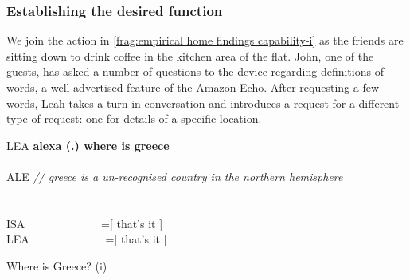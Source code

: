 \subsubsection{Establishing the desired function}\label{sec:empirical home findings capability establish}
\begin{revisedsubmission}
We join the action in \autoref{frag:empirical home findings capability-i} as the friends are sitting down to drink coffee in the kitchen area of the flat.
John, one of the guests, has asked a number of questions to the device regarding definitions of words, a well-advertised feature of the Amazon Echo.
After requesting a few words, Leah takes a turn in conversation and introduces a request for a different type of request: one for details of a specific location.
\end{revisedsubmission}

\begin{inlinefrag}
    {
    \begin{transcript}
        \by LEA {\textbf{alexa (.) where is greece}} \\
         \\
        \by ALE {\textit{// greece is a un-recognised country in the northern hemisphere}} \\
         \\
         \\
        \by ISA {~~~~~~~~~~~~~=[ that’s it ]} \\
        \by LEA {~~~~~~~~~~~~~=[ that’s it ]} \\
    \end{transcript}
    \caption{Where is Greece? (i)}\label{frag:empirical home findings capability-i}
    }
\end{inlinefrag}

